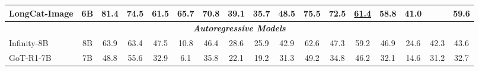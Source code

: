 \begin{table}[t]
{\begin{tabular}{lcccccccccccccccc}
LongCat-Image                    & 6B                                 & 81.4                                 & 74.5                                 & 61.5                                 & 65.7                                 & \cellcolor[HTML]{E2E2E2}70.8                                 & 39.1                                 & {\color[HTML]{F88825} \textbf{35.7}} & 48.5                                 & 75.5                                 & {\color[HTML]{F88825} \textbf{72.5}} & {\color[HTML]{F88825} \underline{61.4}}    & 58.8                                 & {\color[HTML]{F88825} \textbf{41.0}} & \cellcolor[HTML]{E2E2E2}{\color[HTML]{F88825} \underline{54.1}}    & 59.6                                 \\ \midrule
\multicolumn{17}{c}{\textit{\textbf{Autoregressive Models}}}                                                                                                                                                                                                                                                                                                                                                                                                                                                                                                                                                                                                                                                                   \\ \midrule
Infinity-8B                      & 8B                                 & 63.9                                 & 63.4                                 & 47.5                                 & 10.8                                 & \cellcolor[HTML]{E2E2E2}46.4                                 & 28.6                                 & 25.9                                 & 42.9                                 & 62.6                                 & 47.3                                 & 59.2                                 & 46.9                                 & 24.6                                 & \cellcolor[HTML]{E2E2E2}42.3                                 & 43.6                                 \\
GoT-R1-7B                        & 7B                                 & 48.8                                 & 55.6                                 & 32.9                                 & 6.1                                  & \cellcolor[HTML]{E2E2E2}35.8                                 & 22.1                                 & 19.2                                 & 31.3                                 & 49.2                                 & 34.8                                 & 46.2                                 & 32.1                                 & 14.6                                 & \cellcolor[HTML]{E2E2E2}31.2                                 & 32.7                                 \\ \midrule

\end{tabular}}
\end{table}
